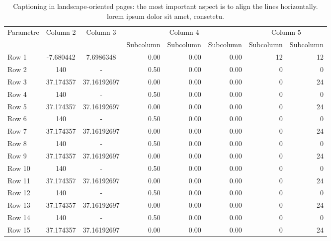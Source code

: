 \begin{landscape}
\thispagestyle{empty}
\vspace{6pt} %
\begin{table}[htp]
\centering
\setlength{\tabcolsep}{14pt}
\captionsetup{justification=centerlast}
\caption{Captioning in landscape-oriented pages: the most important aspect is to align the lines horizontally. lorem ipsum dolor sit amet, consetetu.}
\label{table:ch2-3}
\begin{tabular}{lccrrrrr}
\toprule\midrule
\multirow{2}{*}{Parametre} & \multirow{2}{*}{Column 2} & \multirow{2}{*}{Column 3} & \multicolumn{3}{c}{Column 4} & \multicolumn{2}{c}{Column 5}\\ \cmidrule(lr){4-6} \cmidrule(lr){7-8}
  & & & Subcolumn & Subcolumn & Subcolumn & Subcolumn & Subcolumn\\
\midrule
Row 1 & -7.680442 & 7.6986348 & 0.00 & 0.00 & 0.00 & 12 & 12 \\
Row 2 & 140 & - & 0.50 & 0.00 & 0.00 & 0 & 0 \\
Row 3 & 37.174357 & 37.16192697 & 0.00 & 0.00 & 0.00 & 0 & 24 \\
Row 4 & 140 & - & 0.50 & 0.00 & 0.00 & 0 & 0 \\
Row 5 & 37.174357 & 37.16192697 & 0.00 & 0.00 & 0.00 & 0 & 24 \\
Row 6 & 140 & - & 0.50 & 0.00 & 0.00 & 0 & 0 \\
Row 7 & 37.174357 & 37.16192697 & 0.00 & 0.00 & 0.00 & 0 & 24 \\
Row 8 & 140 & - & 0.50 & 0.00 & 0.00 & 0 & 0 \\
Row 9 & 37.174357 & 37.16192697 & 0.00 & 0.00 & 0.00 & 0 & 24 \\
Row 10 & 140 & - & 0.50 & 0.00 & 0.00 & 0 & 0 \\
Row 11 & 37.174357 & 37.16192697 & 0.00 & 0.00 & 0.00 & 0 & 24 \\
Row 12 & 140 & - & 0.50 & 0.00 & 0.00 & 0 & 0 \\
Row 13 & 37.174357 & 37.16192697 & 0.00 & 0.00 & 0.00 & 0 & 24 \\
Row 14 & 140 & - & 0.50 & 0.00 & 0.00 & 0 & 0 \\
Row 15 & 37.174357 & 37.16192697 & 0.00 & 0.00 & 0.00 & 0 & 24 \\
\bottomrule
\end{tabular}
\end{table}
\vspace{-9pt} %
\vfill\hbox{ }

\ifodd\value{page} %
\end{landscape}

